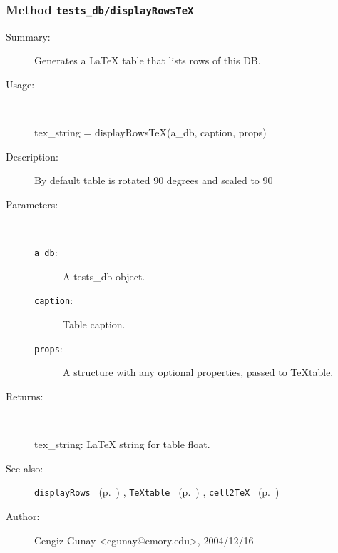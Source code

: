 \subsubsection[Method \texttt{displayRowsTeX}]{Method \texttt{tests\_db/displayRowsTeX}}%
%
\label{ref_tests_db__displayRowsTeX}%
\hypertarget{ref_tests_db__displayRowsTeX}{}%
\begin{description}
\item[Summary:]Generates a LaTeX table that lists rows of this DB.
%
\item[Usage:]~%
\begin{lyxcode}%
tex\_string = displayRowsTeX(a\_db, caption, props)
%
\end{lyxcode}%
%
\item[Description:]%
By default table is rotated 90 degrees and scaled to 90%
\item[Parameters:]~
\begin{description}%
\item[\texttt{a\_db}:]
 A tests\_db object.
\item[\texttt{caption}:]
 Table caption.
\item[\texttt{props}:]
 A structure with any optional properties, passed to TeXtable.
\end{description}%
%
\item[Returns:]~

	tex\_string: LaTeX string for table float.
%
%
\item[See also:]%
\hyperlink{ref_displayRows}{\texttt{displayRows}}%
\ (p.~\pageref{ref_displayRows})%
%
, \hyperlink{ref_TeXtable}{\texttt{TeXtable}}%
\ (p.~\pageref{ref_TeXtable})%
%
, \hyperlink{ref_cell2TeX}{\texttt{cell2TeX}}%
\ (p.~\pageref{ref_cell2TeX})%
%
%
\item[Author:]%
Cengiz Gunay <cgunay@emory.edu>, 2004/12/16%
\end{description}
\methodline%
